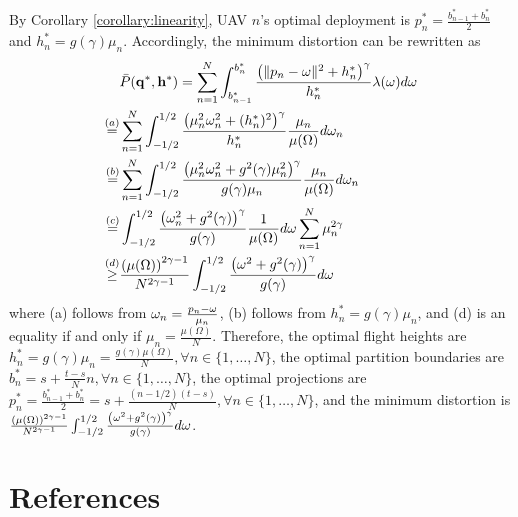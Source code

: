 \documentclass[smallabstract,smallcaptions]{dccpaper}
\renewcommand{\vp}{\mathbf q}
\newcommand{\df}{\ensuremath{\lam}}         %
\newcommand{\bP}{\ensuremath{\vp}}          %
\newcommand{\abPo}{\ensuremath{\bar{P}}}  %
\newcommand{\bH}{\ensuremath{\vh}}          %
\newcommand{\Vor}{\ensuremath{\mathcal{V}}}         %
\newcommand{\philippstart}{\color{black}}
\newcommand{\philippend}{\color{black}}
\newcommand{\junend}{\color{black}}
\begin{document}
By Corollary \ref{corollary:linearity}, UAV $n$'s optimal deployment is $p^*_n=\frac{b^*_{n-1}+b^*_{n}}{2}$ and $h^*_n=g(\gamma)\mu_n$.
Accordingly, the minimum distortion can be rewritten as
\begin{align}
    &\abPo(\bP^*,\bH^*)=\sum_{n=1}^{N}\int_{b^*_{n-1}}^{b^*_{n}}\frac{\left(\|p_n-\ome\|^2+h^*_n\right)^{\gamma}}{h^*_n}\df(\ome) d\ome\\
    \overset{(a)}{=}&\sum_{n=1}^{N}\int_{-1/2}^{1/2} \frac{\left(\mu^2_n\ome^2_n+(h^*_n)^2\right)^{\gamma}}{h^*_n} \frac{\mu_n}{\mu(\Omega)}d\ome_n\\
    \overset{(b)}{=}&\sum_{n=1}^{N}\int_{-1/2}^{1/2}\frac{\left(\mu^2_n\ome^2_n+g^2(\gamma)\mu^2_n\right)^{\gamma}}{g(\gamma)\mu_n} \frac{\mu_n}{\mu(\Omega)}d\ome_n\\
    \overset{(c)}{=}&\int_{-1/2}^{1/2}\frac{\left(\ome^2_n+g^2(\gamma)\right)^{\gamma}}{g(\gamma)} \frac{1}{\mu(\Omega)}d\ome\sum_{n=1}^{N}\mu^{2\gamma}_n\\
    \overset{(d)}{\ge}&\frac{\left(\mu(\Omega)\right)^{2\gamma-1}}{N^{2\gamma-1}}\int_{-1/2}^{1/2}\frac{\left(\ome^2+g^2(\gamma)\right)^{\gamma}}{g(\gamma)} d\ome
  \end{align}
where (a) follows from $\omega_n=\frac{p_n-\omega}{\mu_n}$, (b) follows from $h^*_n=g(\gamma)\mu_n$, and (d) is an equality if and only if $\mu_n=\frac{\mu(\Omega)}{N}$.
Therefore, the optimal flight heights are $h^*_n=g(\gamma)\mu_n=\frac{g(\gamma)\mu(\Omega)}{N}, \forall n\in\{1,\dots,N\}$, the optimal partition boundaries are $b^*_n=s+\frac{t-s}{N}n, \forall n\in\{1,\dots,N\}$, the optimal projections are $p^*_n=\frac{b^*_{n-1}+b^*_{n}}{2}=s+\frac{(n-1/2)(t-s)}{N}, \forall n\in\{1,\dots,N\}$, and the minimum distortion is $\frac{\left(\mu(\Omega)\right)^{2\gamma-1}}{N^{2\gamma-1}}\int_{-1/2}^{1/2}\frac{\left(\omega^2+g^2(\gamma)\right)^{\gamma}}{g(\gamma)} d\omega$.
\fi
\junend
\philippstart
%
\philippend
%
%
\section*{References}
\vspace{-4ex}
\printbibliography
\end{document}
